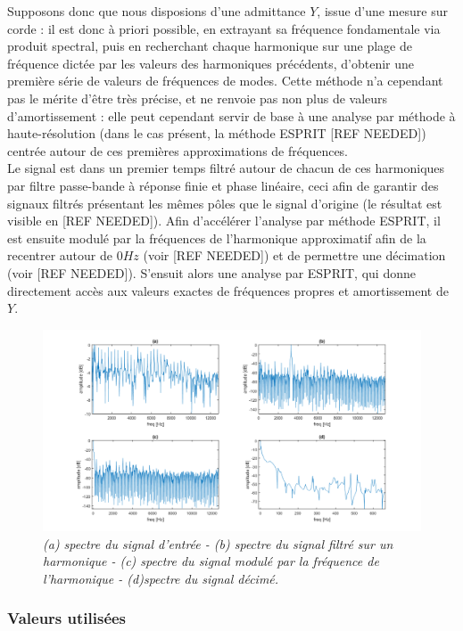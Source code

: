 Supposons donc que nous disposions d'une admittance $Y$, issue d'une mesure sur corde : il est donc à priori possible, en extrayant sa fréquence fondamentale via produit spectral, puis en recherchant chaque harmonique sur une plage de fréquence dictée par les valeurs des harmoniques précédents, d'obtenir une première série de valeurs de fréquences de modes. Cette méthode n'a cependant pas le mérite d'être très précise, et ne renvoie pas non plus de valeurs d'amortissement : elle peut cependant servir de base à une analyse par méthode à haute-résolution (dans le cas présent, la méthode ESPRIT [REF NEEDED]) centrée autour de ces premières approximations de fréquences.\\
Le signal est dans un premier temps filtré autour de chacun de ces harmoniques par filtre passe-bande à réponse finie et phase linéaire, ceci afin de garantir des signaux filtrés présentant les mêmes pôles que le signal d'origine (le résultat est visible en [REF NEEDED]). Afin d'accélérer l'analyse par méthode ESPRIT, il est ensuite modulé par la fréquences de l'harmonique approximatif afin de la recentrer autour de $0 Hz$ (voir [REF NEEDED]) et de permettre une décimation (voir [REF NEEDED]). S'ensuit alors une analyse par ESPRIT, qui donne directement accès aux valeurs exactes de fréquences propres et amortissement de $Y$.

\begin{figure}[h]
\includegraphics[scale=0.5]{figures/pre_proc.png}
\caption{\textit{(a) spectre du signal d'entrée - (b) spectre du signal filtré sur un harmonique - (c) spectre du signal modulé par la fréquence de l'harmonique - (d)spectre du signal décimé.}}
\label{pre_proc}
\end{figure}

\subsubsection{Valeurs utilisées}

